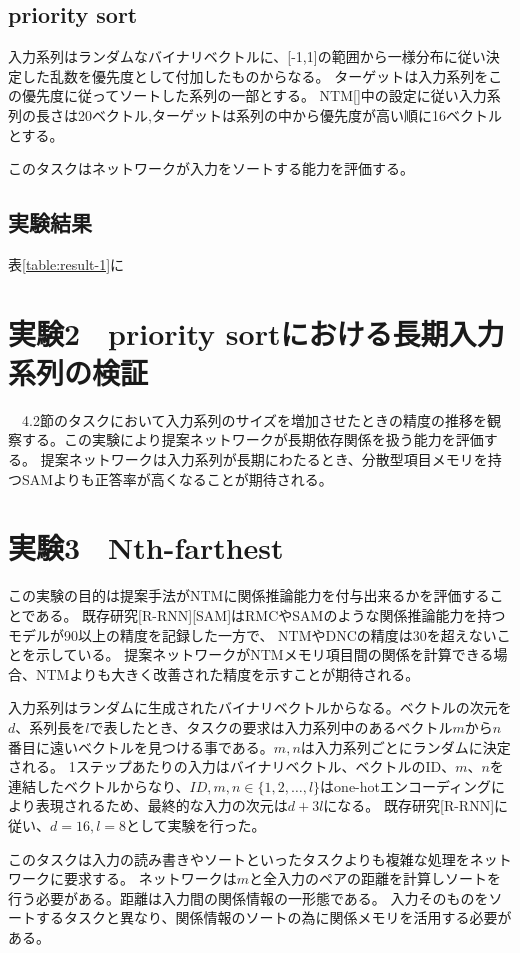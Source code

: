 \subsection{priority sort}
入力系列はランダムなバイナリベクトルに、[-1,1]の範囲から一様分布に従い決定した乱数を優先度として付加したものからなる。
ターゲットは入力系列をこの優先度に従ってソートした系列の一部とする。
NTM[]中の設定に従い入力系列の長さは20ベクトル,ターゲットは系列の中から優先度が高い順に16ベクトルとする。

このタスクはネットワークが入力をソートする能力を評価する。

\subsection{実験結果}
表\ref{table:result-1}に

\section{実験2　priority sortにおける長期入力系列の検証}
　4.2節のタスクにおいて入力系列のサイズを増加させたときの精度の推移を観察する。この実験により提案ネットワークが長期依存関係を扱う能力を評価する。
提案ネットワークは入力系列が長期にわたるとき、分散型項目メモリを持つSAMよりも正答率が高くなることが期待される。

\section{実験3　Nth-farthest}
この実験の目的は提案手法がNTMに関係推論能力を付与出来るかを評価することである。
既存研究[R-RNN][SAM]はRMCやSAMのような関係推論能力を持つモデルが90以上の精度を記録した一方で、
NTMやDNCの精度は30を超えないことを示している。
提案ネットワークがNTMメモリ項目間の関係を計算できる場合、NTMよりも大きく改善された精度を示すことが期待される。

入力系列はランダムに生成されたバイナリベクトルからなる。ベクトルの次元を$d$、系列長を$l$で表したとき、タスクの要求は入力系列中のあるベクトル$m$から$n$番目に遠いベクトルを見つける事である。$m,n$は入力系列ごとにランダムに決定される。
1ステップあたりの入力はバイナリベクトル、ベクトルのID、$m$、$n$を連結したベクトルからなり、$ID,m,n∈\{1,2,…,l\}$はone-hotエンコーディングにより表現されるため、最終的な入力の次元は$d+3l$になる。
既存研究[R-RNN]に従い、$d=16,l=8$として実験を行った。

このタスクは入力の読み書きやソートといったタスクよりも複雑な処理をネットワークに要求する。
ネットワークは$m$と全入力のペアの距離を計算しソートを行う必要がある。距離は入力間の関係情報の一形態である。
入力そのものをソートするタスクと異なり、関係情報のソートの為に関係メモリを活用する必要がある。


